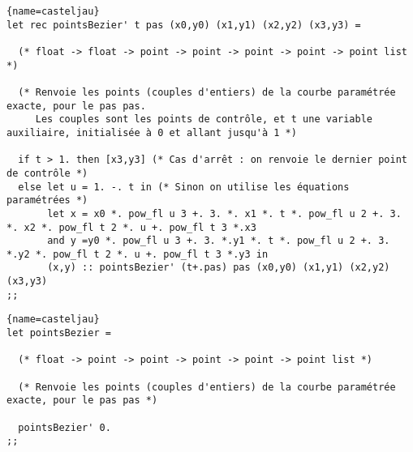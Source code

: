 \documentclass[10pt,twoside,a4paper]{article}
\begin{document}
\begin{lstlisting}{name=casteljau}
let rec pointsBezier' t pas (x0,y0) (x1,y1) (x2,y2) (x3,y3) =

  (* float -> float -> point -> point -> point -> point -> point list *)
  
  (* Renvoie les points (couples d'entiers) de la courbe paramétrée exacte, pour le pas pas.
     Les couples sont les points de contrôle, et t une variable auxiliaire, initialisée à 0 et allant jusqu'à 1 *)
  
  if t > 1. then [x3,y3] (* Cas d'arrêt : on renvoie le dernier point de contrôle *)
  else let u = 1. -. t in (* Sinon on utilise les équations paramétrées *)
       let x = x0 *. pow_fl u 3 +. 3. *. x1 *. t *. pow_fl u 2 +. 3. *. x2 *. pow_fl t 2 *. u +. pow_fl t 3 *.x3
       and y =y0 *. pow_fl u 3 +. 3. *.y1 *. t *. pow_fl u 2 +. 3. *.y2 *. pow_fl t 2 *. u +. pow_fl t 3 *.y3 in
       (x,y) :: pointsBezier' (t+.pas) pas (x0,y0) (x1,y1) (x2,y2) (x3,y3)
;;
\end{lstlisting}

\begin{lstlisting}{name=casteljau}
let pointsBezier =

  (* float -> point -> point -> point -> point -> point list *)

  (* Renvoie les points (couples d'entiers) de la courbe paramétrée exacte, pour le pas pas *)
  
  pointsBezier' 0.
;;
\end{lstlisting}
\end{document}
